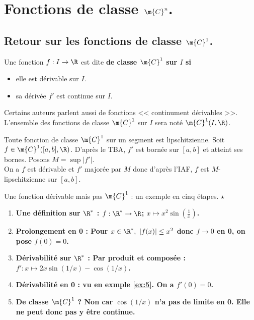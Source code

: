 \documentclass[11pt]{article}
\begin{document}
\section{Fonctions de classe \texorpdfstring{$\m{C}^n$}{Lg}.}

\subsection{Retour sur les fonctions de classe \texorpdfstring{$\m{C}^1$}{Lg}.}

\begin{defi}{}{}
    Une fonction $f:I\to\R$ est dite \bf{de classe} $\m{C}^1$ sur $I$ si
    \begin{itemize}
        \item elle est dérivable sur $I$.
        \item sa dérivée $f'$ est continue sur $I$.
    \end{itemize}
    Certains auteurs parlent aussi de fonctions << continument dérivables >>.\\
    L'ensemble des fonctions de classe $\m{C}^1$ sur $I$ sera noté $\m{C}^1(I,\R)$.
\end{defi}

\begin{prop}{}{}
    Toute fonction de classe $\m{C}^1$ sur un segment est lipschitzienne.
    \tcblower
    Soit $f\in\m{C}^1([a,b],\R)$. D'après le TBA, $f'$ est bornée sur $[a,b]$ et atteint ses bornes. Posons $M=\sup|f'|$.\\
    On a $f$ est dérivable et $f'$ majorée par $M$ donc d'après l'IAF, $f$ est $M$-lipschitzienne sur $[a,b]$.
\end{prop}

\begin{ex}{Une fonction dérivable mais pas $\m{C}^1$ : un exemple en cinq étapes. $\star$}{}
    \begin{enumerate}
        \item \bf{Une définition sur $\R^*$} : $f:\R^*\to\R$; $x\mapsto x^2\sin(\frac{1}{x})$.
        \item \bf{Prolongement en 0} : Pour $x\in\R^*, ~ |f(x)|\leq x^2$ donc $f\to0$ en 0, on pose $f(0)=0$.
        \item \bf{Dérivabilité sur $\R^*$} : Par produit et composée : $f':x\mapsto 2x\sin(1/x)-\cos(1/x)$.
        \item \bf{Dérivabilité en 0} : vu en exmple \ref{ex:5}. On a $f'(0)=0$.
        \item \bf{De classe $\m{C}^1$ ?} Non car $\cos(1/x)$ n'a pas de limite en 0. Elle ne peut donc pas y être continue.  
    \end{enumerate}
\end{ex}
\end{document}

